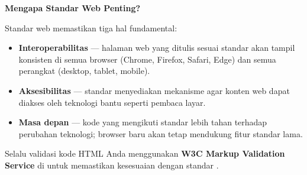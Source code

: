 \begin{konsep}
\textbf{Mengapa Standar Web Penting?}

Standar web memastikan tiga hal fundamental:
\begin{itemize}
  \item \textbf{Interoperabilitas} --- halaman web yang ditulis sesuai standar akan tampil konsisten di semua browser (Chrome, Firefox, Safari, Edge) dan semua perangkat (desktop, tablet, mobile).
  \item \textbf{Aksesibilitas} --- standar menyediakan mekanisme agar konten web dapat diakses oleh teknologi bantu seperti pembaca layar.
  \item \textbf{Masa depan} --- kode yang mengikuti standar lebih tahan terhadap perubahan teknologi; browser baru akan tetap mendukung fitur standar lama.
\end{itemize}
Selalu validasi kode HTML Anda menggunakan \textbf{W3C Markup Validation Service} di  untuk memastikan kesesuaian dengan standar \cite{w3cValidator}.
\end{konsep}

